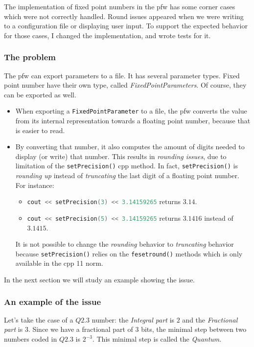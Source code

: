 The implementation of fixed point numbers in the \gls{pfw} has some
corner cases which were not correctly handled. Round issues appeared when we
were writing to a configuration file or displaying user input. To
support the expected behavior for those cases, I changed the implementation, and
wrote tests for it.

\subsubsection{The problem}
The \gls{pfw} can export parameters to a file. It has several parameter types.
Fixed point number have their own type, called \emph{FixedPointParameters}. Of course, they can be exported as well.
\begin{itemize}
    \item When exporting a \lstinline{FixedPointParameter} to a file, the \gls{pfw} converts the value from
        its internal representation towards a floating point number, because that is
        easier to read.
    \item By converting that number, it also computes the amount of digits needed to display (or write) that number.
        This results in \emph{rounding issues}, due to limitation of the \lstinline{setPrecision()} \gls{cpp} method.
        In fact, \lstinline{setPrecision()} is \emph{rounding up} instead of \emph{truncating} the last digit of a floating point number.
        For instance:
        \begin{itemize}
            \item \lstinline[language=C++]{cout << setPrecision(3) << 3.14159265} returns $3.14$.
            \item \lstinline[language=C++]{cout << setPrecision(5) << 3.14159265} returns $3.1416$ instead of $3.1415$.
        \end{itemize}
        It is not possible to change the \emph{rounding} behavior to \emph{truncating} behavior because
        \lstinline{setPrecision()} relies on the \lstinline{fesetround()} methods which is only available in the \gls{cpp} 11 norm.
\end{itemize}
In the next section we will study an example showing the issue.

\subsubsection{An example of the issue}

Let's take the case of a $Q2.3$ number: the \emph{Integral part} is $2$ and the
\emph{Fractional part} is $3$.
Since we have a fractional part of $3$ bits, the minimal step between two numbers coded in $Q2.3$ is
$2^{-3}$. This minimal step is called the \emph{Quantum}.

